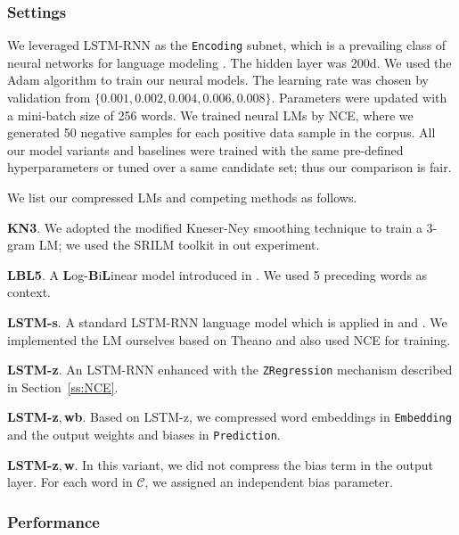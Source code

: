 \documentclass[11pt]{article}
\def\Embedding{\texttt{Embedding}}
\def\Encoding{\texttt{Encoding}}
\def\Prediction{\texttt{Prediction}}
\begin{document}
\subsubsection{Settings}

We leveraged LSTM-RNN as the \Encoding{} subnet, which is a prevailing class of neural networks for language modeling \cite{Sundermeyer:2015gj,visualize}. The hidden layer was 200d. We used the Adam algorithm to train our neural models. The learning rate was chosen by validation from $\{0.001,0.002,0.004,0.006,0.008\}$. Parameters were updated with a mini-batch size of 256 words. We trained neural LMs by NCE, where we generated 50 negative samples for each positive data sample in the corpus. All our model variants and baselines were trained with the same pre-defined hyperparameters or tuned over a same candidate set; thus our comparison is fair. %

We list our compressed LMs and competing methods as follows.
\begin{compactitem}[\ \ \ $\bullet$]
\item \textbf{KN3}. We adopted the modified Kneser-Ney smoothing technique to train a 3-gram LM; we used the SRILM toolkit \cite{toolkit} in out experiment.
\item \textbf{LBL5}. A \textbf{L}og-\textbf{B}i\textbf{L}inear model introduced in . We used 5 preceding words as context.
\item \textbf{LSTM-s}. A standard LSTM-RNN language model which is applied in  and . We implemented the LM ourselves based on Theano \cite{2016arXiv160502688short} and also used NCE for training.
\item \textbf{LSTM-z}. An LSTM-RNN enhanced with the \texttt{ZRegression} mechanism described in Section~\ref{ss:NCE}.
\item \textbf{LSTM-z$,$wb}. Based on LSTM-z, we compressed word embeddings in \Embedding{} and the output weights and biases in \Prediction{}.
\item \textbf{LSTM-z$,$w}. In this variant, we did not compress the bias term in the output layer. For each word in $\mathcal{C}$, we assigned an independent bias parameter.
\end{compactitem}

\subsubsection{Performance}
\end{document}
